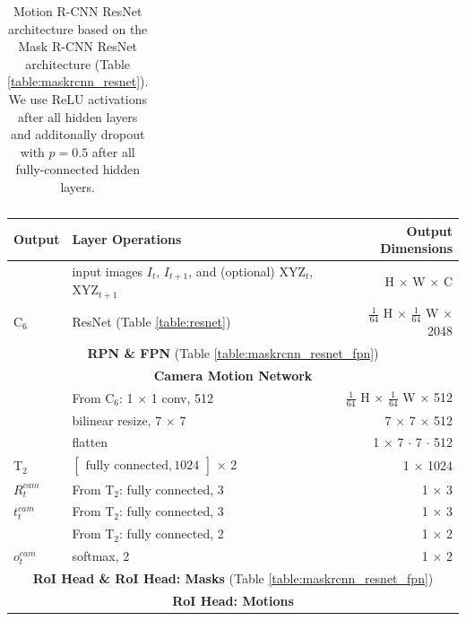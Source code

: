{\begin{table}[h]
\begin{tabular}{llr}
\bottomrule
\end{tabular}

\caption {
Motion R-CNN ResNet architecture based on the Mask R-CNN
ResNet architecture (Table \ref{table:maskrcnn_resnet}).
We use ReLU activations after all hidden layers and
additonally dropout with $p = 0.5$ after all fully-connected hidden layers.
}
\label{table:motionrcnn_resnet}
\end{table}
}

{
\begin{table}[h]
\centering
\begin{tabular}{llr}
\toprule
\textbf{Output} & \textbf{Layer Operations} & \textbf{Output Dimensions} \\
\midrule\midrule
& input images $I_t$, $I_{t+1}$, and (optional) XYZ$_{t}$, XYZ$_{t+1}$  & H $\times$ W $\times$ C \\
\midrule
C$_6$ & ResNet (Table \ref{table:resnet}) & $\tfrac{1}{64}$ H $\times$ $\tfrac{1}{64}$ W $\times$ 2048 \\
\midrule
\multicolumn{3}{c}{\textbf{RPN \& FPN} (Table \ref{table:maskrcnn_resnet_fpn})} \\
\midrule
\multicolumn{3}{c}{\textbf{Camera Motion Network}}\\
\midrule
& From C$_6$: 1 $\times$ 1 conv, 512 & $\tfrac{1}{64}$ H $\times$ $\tfrac{1}{64}$ W $\times$ 512 \\
& bilinear resize, 7 $\times$ 7 & 7 $\times$ 7 $\times$ 512 \\
& flatten & 1 $\times$ 7 $\cdot$ 7 $\cdot$ 512 \\
T$_2$ & $\begin{bmatrix}\textrm{fully connected}, 1024\end{bmatrix}$ $\times$ 2  & 1 $\times$ 1024 \\
$R_t^{cam}$& From T$_2$: fully connected, 3 & 1 $\times$ 3 \\
$t_t^{cam}$& From T$_2$: fully connected, 3 & 1 $\times$ 3 \\
& From T$_2$: fully connected, 2 & 1 $\times$ 2 \\
$o_t^{cam}$& softmax, 2 & 1 $\times$ 2 \\
\midrule
\multicolumn{3}{c}{\textbf{RoI Head \& RoI Head: Masks} (Table \ref{table:maskrcnn_resnet_fpn})} \\
\midrule
\multicolumn{3}{c}{\textbf{RoI Head: Motions}}\\
\midrule

\end{tabular}
\end{table}}
